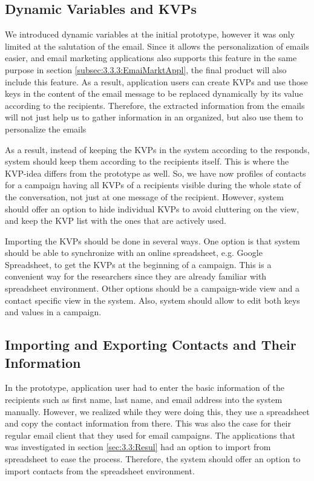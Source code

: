\subsection{Dynamic Variables and \ac{KVP}s}
\label{subsec:5.1.2:DynmVariKVPs}
We introduced dynamic variables at the initial prototype, however it was only limited at the salutation of the email. Since it allows the personalization of emails easier, and email marketing applications also supports this feature in the same purpose in section \ref{subsec:3.3.3:EmaiMarktAppl}, the final product will also include this feature. As a result, application users can create \ac{KVP}s and use those keys in the content of the email message to be replaced dynamically by its value according to the recipients. Therefore, the extracted information from the emails will not just help us to gather information in an organized, but also use them to personalize the emails
\vspace{1cm}

As a result, instead of keeping the \ac{KVP}s in the system according to the responds, system should keep them according to the recipients itself. This is where the \ac{KVP}-idea differs from the prototype as well. So, we have now profiles of contacts for a campaign having all \ac{KVP}s of a recipients visible during the whole state of the conversation, not just at one message of the recipient. However, system should offer an option to hide individual \ac{KVP}s to avoid cluttering on the view, and keep the \ac{KVP} list with the ones that are actively used.

\vspace{1cm}
Importing the \ac{KVP}s should be done in several ways. One option is that system should be able to synchronize with an online spreadsheet, e.g. Google Spreadsheet, to get the \ac{KVP}s at the beginning of a campaign. This is a convenient way for the researchers since they are already familiar with spreadsheet environment. Other options should be a campaign-wide view and a contact specific view in the system. Also, system should allow to edit both keys and values in a campaign.

\subsection{Importing and Exporting Contacts and Their Information}
\label{subsec:5.1.3:ImpoExpoContInfo}
In the prototype, application user had to enter the basic information of the recipients such as first name, last name, and email address into the system manually. However, we realized while they were doing this, they use a spreadsheet and copy the contact information from there. This was also the case for their regular email client that they used for email campaigns. The applications that was investigated in section \ref{sec:3.3:Resul} had an option to import from spreadsheet to ease the process. Therefore, the system should offer an option to import contacts from the spreadsheet environment.
\vspace{1cm}

